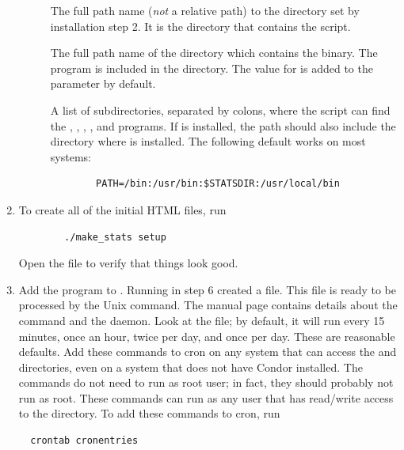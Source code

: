 \begin{enumerate}
\begin{description}
	\item[] The full path name
	(\emph{not} a relative path) to the  directory set
	by installation step 2.  
	It is the directory that contains the  script.

	\item[]  The full path name of the
	directory which contains the  binary.
	The  program is included in the 
	directory. 
	The value for  is added to the 
	parameter by default.  

	\item[] A list of subdirectories,
	separated by colons, where the  script can find
	the , , , , and 
	programs.  
	If  is installed, the path should also
	include the directory where  is installed.
	The following default works on most systems:
        \begin{verbatim} 
        PATH=/bin:/usr/bin:$STATSDIR:/usr/local/bin
        \end{verbatim}

        \end{description}

\item To create all of the initial HTML files, run
\begin{verbatim}
        ./make_stats setup  
\end{verbatim}
Open the file  to verify that things look good.


\item Add the  program to .  
Running  in step 6 created a  file.
This  file is ready to be processed by the Unix
 command.
The  manual page contains details about
the  command and the  daemon.
Look at the
 file; by default, it will run 
  every 15 minutes, 
  once an hour, 
  twice per day, and 
  once per day.
These are reasonable defaults.  
Add these commands to cron on any
system that can access the  and
 directories,
even on a system that does not have Condor installed.
The commands do not need to run as root user;
in fact, they should probably not run as root.  These commands can run
as any user that has read/write access to the  directory.
To add these
commands to cron, run
\begin{verbatim} 
  crontab cronentries
\end{verbatim}


\end{enumerate}
